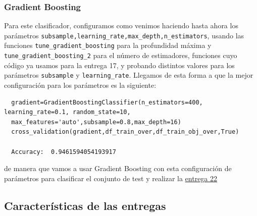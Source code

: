 \documentclass[a4paper,11pt]{article}
\begin{document}
  \subsubsection{Gradient Boosting}
  
  Para este clasificador, configuramos como venimos haciendo hasta ahora los parámetros \texttt{subsample,learning_rate,max_depth,n_estimators}, usando las funciones \texttt{tune_gradient_boosting} para la profundidad máxima y \texttt{tune_gradient_boosting_2} para el número de estimadores, funciones cuyo código ya usamos para la entrega 17, y probando distintos valores para los parámetros \texttt{subsample} y \texttt{learning_rate}. Llegamos de esta forma a que la mejor configuración para los parámetros es la siguiente:
  
  \begin{verbatim}
  gradient=GradientBoostingClassifier(n_estimators=400, learning_rate=0.1, random_state=10,
  max_features='auto',subsample=0.8,max_depth=16)
  cross_validation(gradient,df_train_over,df_train_obj_over,True)
  
  Accuracy:  0.9461594054193917
  \end{verbatim}
  
  de manera que vamos a usar Gradient Boosting con esta configuración de parámetros para clasificar el conjunto de test y realizar la \underline{entrega 22} 
  \subsection{Características de las entregas}
  
\end{document}
